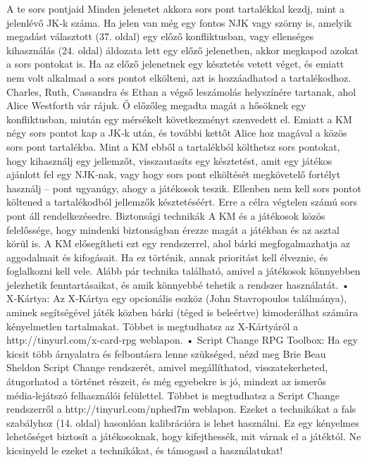 \documentclass[oneside]{book}
\begin{document}
A te sors pontjaid
Minden jelenetet akkora sors pont tartalékkal kezdj, mint a jelenlévő JK‑k száma. Ha jelen van még egy fontos NJK vagy szörny is, amelyik megadást választott (37. oldal) egy előző konfliktusban, vagy ellenséges kihasználás (24. oldal) áldozata lett egy előző jelenetben, akkor megkapod azokat a sors pontokat is. Ha az előző jelenetnek egy késztetés vetett véget, és emiatt nem volt alkalmad a sors pontot elkölteni, azt is hozzáadhatod a tartalékodhoz.
Charles, Ruth, Cassandra és Ethan a végső leszámolás helyszínére tartanak, ahol Alice Westforth vár rájuk. Ő előzőleg megadta magát a hősöknek egy konfliktusban, miután egy mérsékelt következményt szenvedett el. Emiatt a KM négy sors pontot kap a JK‑k után, és további kettőt Alice hoz magával a közös sors pont tartalékba.
Mint a KM ebből a tartalékból költhetsz sors pontokat, hogy kihasználj egy jellemzőt, visszautasíts egy késztetést, amit egy játékos ajánlott fel egy NJK‑nak, vagy hogy sors pont elköltését megkövetelő fortélyt használj – pont ugyanúgy, ahogy a játékosok teszik.
Ellenben nem kell sors pontot költened a tartalékodból jellemzők késztetéséért. Erre a célra végtelen számú sors pont áll rendelkezésedre.
Biztonsági technikák
A KM és a játékosok közös felelőssége, hogy mindenki biztonságban érezze magát a játékban és az asztal körül is. A KM elősegítheti ezt egy rendszerrel, ahol bárki megfogalmazhatja az aggodalmait és kifogásait. Ha ez történik, annak prioritást kell élveznie, és foglalkozni kell vele. Alább pár technika található, amivel a játékosok könnyebben jelezhetik fenntartásaikat, és amik könnyebbé tehetik a rendszer használatát.
    • X‑Kártya: Az X‑Kártya egy opcionális eszköz (John Stavropoulos találmánya), aminek segítségével játék közben bárki (téged is beleértve) kimoderálhat számára kényelmetlen tartalmakat. Többet is megtudhatsz az X‑Kártyáról a http://tinyurl.com/x-card-rpg weblapon.
    • Script Change RPG Toolbox: Ha egy kicsit több árnyalatra és felbontásra lenne szükséged, nézd meg Brie Beau Sheldon Script Change rendszerét, amivel megállíthatod, visszatekerheted, átugorhatod a történet részeit, és még egyebekre is jó, mindezt az ismerős média‑lejátszó felhasználói felülettel. Többet is megtudhatsz a Script Change rendszerről a http://tinyurl.com/nphed7m weblapon.
Ezeket a technikákat a fals szabályhoz (14. oldal) hasonlóan kalibrációra is lehet használni. Ez egy kényelmes lehetőséget biztosít a játékosoknak, hogy kifejthessék, mit várnak el a játéktól. Ne kicsinyeld le ezeket a technikákat, és támogasd a használatukat!
\end{document}
